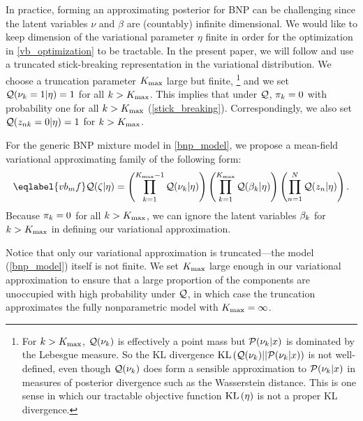 In practice, forming an approximating posterior for BNP can be challenging since
the latent variables $\nu$ and $\beta$ are (countably) infinite dimensional. We
would like to keep dimension of the variational parameter $\eta$ finite in order
for the optimization in \eqref{vb_optimization} to be tractable. In the present
paper, we will follow \citet{blei:2006:vi_for_dp} and use a truncated
stick-breaking representation in the variational distribution. We choose a
truncation parameter ${K_{\mathrm{max}}}$ large but finite,
%
\footnote{For $k > {K_{\mathrm{max}}}$, $\mathcal{Q}(\nu_k)$ is effectively a point mass  but
$\mathcal{P}(\nu_k \vert x)$ is dominated by the Lebesgue measure.  So the KL
divergence $\mathrm{KL}\left(\mathcal{Q}(\nu_k) || \mathcal{P}(\nu_k \vert x)\right)$ is not well-defined, even
though $\mathcal{Q}(\nu_k)$ does form a sensible approximation to $\mathcal{P}(\nu_k \vert x)$
in measures of posterior divergence such as the Wasserstein distance.  This is
one sense in which our tractable objective function $\mathrm{KL}\left(\eta\right)$ is not a proper
KL divergence. }
%
and we set $\mathcal{Q}(\nu_k = 1 | \eta) =
1$ for all $k > {K_{\mathrm{max}}}$. This implies that under $\mathcal{Q}$, $\pi_k = 0$ with
probability one for all $k > {K_{\mathrm{max}}}$ (\eqref{stick_breaking}). Correspondingly,
we also set $\mathcal{Q}(z_{nk} = 0 | \eta) = 1$ for $k > {K_{\mathrm{max}}}$.

For the generic BNP mixture model in \eqref{bnp_model},
we propose a mean-field variational approximating family of the following form:
%
\begin{align}\eqlabel{vb_mf}
%
\q(\zeta \vert \eta) =
    \left( \prod_{\k=1}^{\kmax - 1} \q(\nuk \vert \eta) \right)
    \left( \prod_{\k=1}^{\kmax} \q(\beta_\k \vert \eta) \right)
    \left( \prod_{\n=1}^{\N} \q(\z_{\n} \vert \eta) \right).
%
\end{align}
%
Because $\pi_k = 0$ for all $k > {K_{\mathrm{max}}}$, we can ignore the latent variables
$\beta_k$ for $k > {K_{\mathrm{max}}}$ in defining our variational approximation.

Notice that only our variational approximation is truncated---the model
(\eqref{bnp_model}) itself is not finite. We set ${K_{\mathrm{max}}}$ large enough in our
variational approximation to ensure that a large proportion of the components
are unoccupied with high probability under $\mathcal{Q}$, in which case the truncation
approximates the fully nonparametric model with ${K_{\mathrm{max}}} = \infty$.
